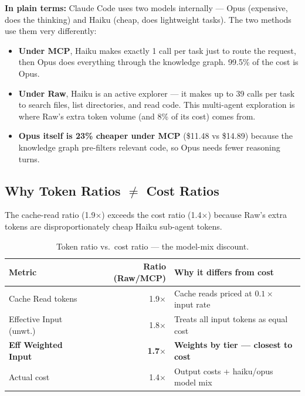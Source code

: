 \noindent
\textbf{In plain terms:} Claude Code uses two models internally ---
Opus (expensive, does the thinking) and Haiku (cheap, does lightweight
tasks).  The two methods use them very differently:

\begin{itemize}[nosep, leftmargin=*]
\item \textbf{Under MCP}, Haiku makes exactly 1 call per task just to
      route the request, then Opus does everything through the
      knowledge graph.  99.5\% of the cost is Opus.

\item \textbf{Under Raw}, Haiku is an active explorer --- it makes
      up to 39 calls per task to search files, list directories, and
      read code.  This multi-agent exploration is where Raw's extra
      token volume (and 8\% of its cost) comes from.

\item \textbf{Opus itself is 23\% cheaper under MCP} (\$11.48 vs
      \$14.89) because the knowledge graph pre-filters relevant code,
      so Opus needs fewer reasoning turns.
\end{itemize}

\subsection{Why Token Ratios $\neq$ Cost Ratios}
\label{sec:token-cost-gap}

The cache-read ratio (1.9$\times$) exceeds the cost ratio
(1.4$\times$) because Raw's extra tokens are
disproportionately cheap Haiku sub-agent tokens.

\begin{table}[h]
\centering
\caption{Token ratio vs.\ cost ratio --- the model-mix discount.}\label{tab:ratio-gap}
\begin{tabular}{lrl}
\toprule
\textbf{Metric} & \textbf{Ratio (Raw/MCP)} & \textbf{Why it differs from cost} \\
\midrule
Cache Read tokens          & 1.9$\times$ & Cache reads priced at $0.1\times$ input rate \\
Effective Input (unwt.)    & 1.8$\times$ & Treats all input tokens as equal cost \\
\textbf{Eff Weighted Input}& \textbf{1.7$\times$} & \textbf{Weights by tier --- closest to cost} \\
Actual cost                & 1.4$\times$ & Output costs + haiku/opus model mix \\
\bottomrule
\end{tabular}
\end{table}

